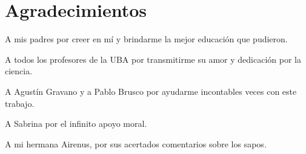 \chapter*{Agradecimientos}

\noindent A mis padres por creer en mí y brindarme la mejor educación que pudieron.

\noindent A todos los profesores de la UBA por transmitirme su amor y dedicación por la ciencia.

\noindent A Agustín Gravano y a Pablo Brusco por ayudarme incontables veces con este trabajo.

\noindent A Sabrina por el infinito apoyo moral.

\noindent A mi hermana Airenus, por sus acertados comentarios sobre los sapos.

